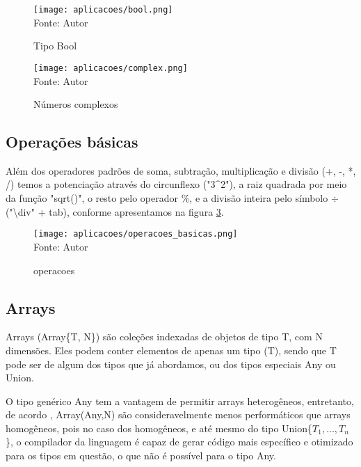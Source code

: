     \begin{figure}[H]
    \begin{center}
        \caption{Tipo Bool} \label{bool}
        \texttt{[image: aplicacoes/bool.png]} \\
        {\tiny \sf Fonte: Autor}
    \end{center}
    \end{figure} 

  \begin{figure}[H]
  \begin{center}
      \caption{Números complexos} \label{complex}
      \texttt{[image: aplicacoes/complex.png]} \\
      {\tiny \sf Fonte: Autor}
  \end{center}
  \end{figure} 

\subsection{Operações básicas}
Além dos operadores padrões de soma, subtração, multiplicação e divisão (+, -, *, /) temos a potenciação através do circunflexo ("3\^{}2"), a raiz quadrada por meio da função "sqrt()", o resto pelo operador \%, e a divisão inteira pelo símbolo $\div$ ("\textbackslash div" + tab), conforme apresentamos na figura \ref{operacoes}. 

    \begin{figure}[H]
    \begin{center}
        \caption{operacoes} \label{operacoes}
        \texttt{[image: aplicacoes/operacoes\_basicas.png]} \\
        {\tiny \sf Fonte: Autor}
    \end{center}
    \end{figure} 



\subsection{Arrays}
Arrays (Array\{T, N\}) são coleções indexadas de objetos de tipo T, com N dimensões. %
 Eles podem conter elementos de apenas um tipo (T), sendo que T pode ser de algum dos tipos que já abordamos, ou dos tipos especiais Any ou Union{}.
 
 O tipo genérico Any tem a vantagem de permitir arrays heterogêneos, entretanto, de acordo \cite{Lobianco2019}, Array(Any,N) são consideravelmente menos performáticos que arrays homogêneos, pois no caso dos homogêneos, e até mesmo do tipo Union\{$T_1,...,T_n$\}, o compilador da linguagem é capaz de gerar código mais específico e otimizado para os tipos em questão, o que não é possível para o tipo Any.  

